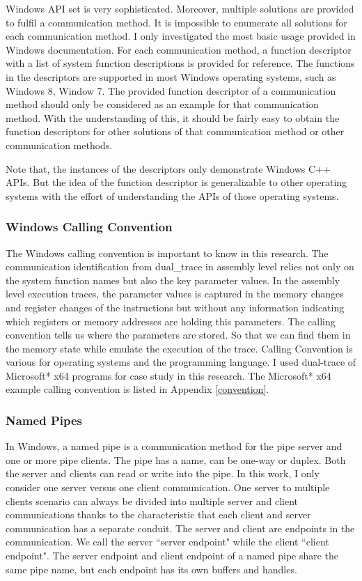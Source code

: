 Windows API set is very sophisticated. Moreover, multiple solutions are provided to fulfil a communication method. It is impossible to enumerate all solutions for each communication method. I only investigated the most basic usage provided in Windows documentation. For each communication method, a function descriptor with a list of system function descriptions is provided for reference. The functions in the descriptors are supported in most Windows operating systems, such as Windows 8, Window 7. The provided function descriptor of a communication method should only be considered as an example for that communication method. With the understanding of this, it should be fairly easy to obtain the function descriptors for other solutions of that communication method or other communication methods. 

Note that, the instances of the descriptors only demonstrate Windows C++ APIs. But the idea of the function descriptor is generalizable to other operating systems with the effort of understanding the APIs of those operating systems.

\subsubsection{Windows Calling Convention}
The Windows calling convention is important to know in this research. The communication identification from dual\_trace in assembly level relies not only on the system function names but also the key parameter values. In the assembly level execution traces, the parameter values is captured in the memory changes and register changes of the instructions but without any information indicating which registers or memory addresses are holding this parameters. The calling convention tells us where the parameters are stored. So that we can find them in the memory state while emulate the execution of the trace. Calling Convention is various for operating systems and the programming language. I used dual-trace of Microsoft* x64 programs for case study in this research. The Microsoft* x64 example calling convention is listed in Appendix \ref{convention}.

\subsubsection{Named Pipes}
In Windows, a named pipe is a communication method for the pipe server and one or more pipe clients. The pipe has a name, can be one-way or duplex. Both the server and clients can read or write into the pipe.\cite{WinNamedpipe} In this work, I only consider one server versus one client communication. One server to multiple clients scenario can always be divided into multiple server and client communications thanks to the characteristic that each client and server communication has a separate conduit. The server and client are endpoints in the communication. We call the server ``server endpoint" while the client ``client endpoint".  The server endpoint and client endpoint of a named pipe share the same pipe name, but each endpoint has its own buffers and handles. 

